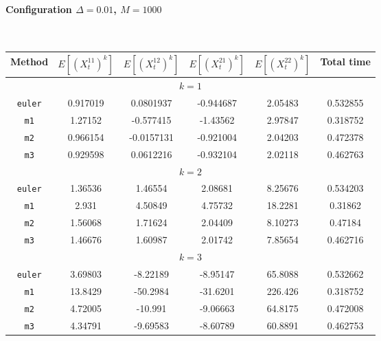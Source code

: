 \paragraph*{Configuration $\Delta=0.01$, $M=1000$}\hfill\\
\begin{tabular}{@{}*{6}{c}@{}}
Method & $E[(X^{11}_t)^k]$ & $E[(X^{12}_t)^k]$ & $E[(X^{21}_t)^k]$ & $E[(X^{22}_t)^k]$ & Total time\\
\hline
\multicolumn{6}{c}{$k=1$}\\
\verb+euler+ & 0.917019 & 0.0801937 & -0.944687 & 2.05483 & 0.532855 \\
 \verb+m1+ & 1.27152 & -0.577415 & -1.43562 & 2.97847 & 0.318752 \\
 \verb+m2+ & 0.966154 & -0.0157131 & -0.921004 & 2.04203 & 0.472378 \\
 \verb+m3+ & 0.929598 & 0.0612216 & -0.932104 & 2.02118 & 0.462763 \\
\hline
\multicolumn{6}{c}{$k=2$}\\
\verb+euler+ & 1.36536 & 1.46554 & 2.08681 & 8.25676 & 0.534203 \\
 \verb+m1+ & 2.931 & 4.50849 & 4.75732 & 18.2281 & 0.31862 \\
 \verb+m2+ & 1.56068 & 1.71624 & 2.04409 & 8.10273 & 0.47184 \\
 \verb+m3+ & 1.46676 & 1.60987 & 2.01742 & 7.85654 & 0.462716 \\
\hline
\multicolumn{6}{c}{$k=3$}\\
\verb+euler+ & 3.69803 & -8.22189 & -8.95147 & 65.8088 & 0.532662 \\
 \verb+m1+ & 13.8429 & -50.2984 & -31.6201 & 226.426 & 0.318752 \\
 \verb+m2+ & 4.72005 & -10.991 & -9.06663 & 64.8175 & 0.472008 \\
 \verb+m3+ & 4.34791 & -9.69583 & -8.60789 & 60.8891 & 0.462753 
\end{tabular}\hfill\\
